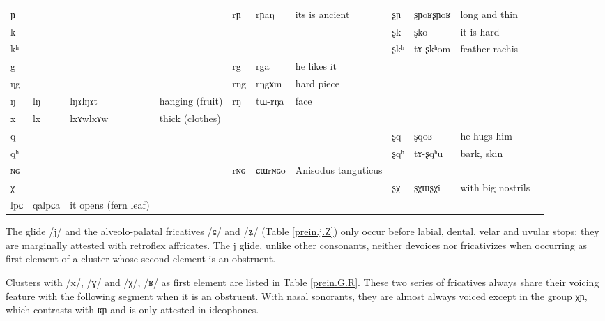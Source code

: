 \documentclass[oldfontcommands,oneside,a4paper,11pt]{article}
\newcommand{\ipa}[1]{{\phon #1}} %
\newcommand{\idph}[1]{\cellcolor{gray}\textbf{#1}}
\begin{document}
\begin{table}
{\begin{tabular}{l|lll|lll|lll|l}
\ipa{ɲ}  & 	  & 	  & 	  & 	 \ipa{rɲ}  & 	 \ipa{rɲaŋ}  & 	 its is ancient & 	 \ipa{ʂɲ} \idph{}  & 	\ipa{ʂɲoʁʂɲoʁ} & 	long and thin & 	\\
\ipa{k}  & 	  & 	  & 	  & 	 & 	 & 	 & 	 \ipa{ʂk}  & 	 \ipa{ʂko}  & 	 it is hard & 	\\
\ipa{kʰ}  & 	  & 	  & 	  & 	 & 	 & 	 & 	 \ipa{ʂkʰ}  & 	 \ipa{tɤ-ʂkʰom}  & 	 feather rachis & 	\\
\ipa{g}  & 	  & 	  & 	  & 	 \ipa{rg}  & 	 \ipa{rga}  & 	 he likes it & 	 & 	 & 	 & 	\\
\ipa{ŋg}  & 	  & 	  & 	  & 	 \ipa{rŋg}  & 	 \ipa{rŋgɤm}  & 	hard piece  & 	 & 	 & 	 & 	\\
\ipa{ŋ}  & 	 \ipa{lŋ} \idph{}  & 	 \ipa{lŋɤlŋɤt}  & 	hanging (fruit)  & 	 \ipa{rŋ}  & 	 \ipa{tɯ-rŋa}  & 	 face & 	 & 	 & 	 & 	\\
\ipa{x}  & 	 \ipa{lx} \idph{}  & 	 \ipa{lxɤwlxɤw}  & 	thick (clothes)  & 	  & 	  & 	  & 	 & 	 & 	 & 	\\
\ipa{q}  & 	  & 	  & 	  & 	 & 	 & 	 & 	 \ipa{ʂq}  & 	 \ipa{ʂqoʁ}  & 	he hugs him  & 	\\
\ipa{qʰ}  & 	  & 	  & 	  & 	 & 	 & 	 & 	 \ipa{ʂqʰ}  & 	 \ipa{tɤ-ʂqʰu}  & 	bark, skin & 	\\
\ipa{ɴɢ}  & 	  & 	  & 	  & 	 \ipa{rɴɢ}  & 	 \ipa{ɕɯrɴɢo}  & 	Anisodus tanguticus  & 	 & 	 & 	 & 	\\
\ipa{χ}  & 	  & 	  & 	  & 	 & 	 & 	 & 	 \ipa{ʂχ}  & 	 \ipa{ʂχɯʂχi}  & 	with big nostrils  & 	\\
\midrule
\ipa{lpɕ}	&\ipa{qalpɕa} & it opens (fern leaf) \\
\bottomrule
\end{tabular}}
\end{table}
 
  The glide /j/  and the alveolo-palatal fricatives /ɕ/ and /ʑ/ (Table \ref{prein.j.Z}) only occur before labial, dental, velar and uvular stops; they are marginally attested with retroflex affricates. The \ipa{j} glide, unlike other consonants, neither devoices nor fricativizes when occurring as first element of a cluster whose second element is an obstruent.


  Clusters with   /x/, /ɣ/ and /χ/, /ʁ/ as first element are listed in Table \ref{prein.G.R}. These two series of fricatives  always share their voicing feature with the following segment when it is an obstruent. With nasal sonorants, they are  almost always voiced except in the group \ipa{χɲ}, which contrasts with \ipa{ʁɲ} and is only attested in ideophones.
  
\end{document}
